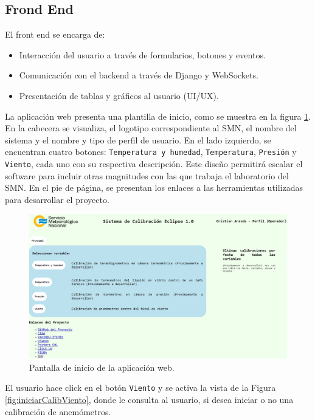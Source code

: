 \subsection{Frond End}\label{sec:frondEnd}

El front end se encarga de:
\begin{itemize}
    \item Interacción del usuario a través de formularios, botones y eventos.
    \item Comunicación con el backend a través de Django y WebSockets.
    \item Presentación de tablas y gráficos al usuario (UI/UX).
\end{itemize}
La aplicación web presenta una plantilla de inicio, como se muestra en la figura \ref{fig:index}. En la cabecera se visualiza, el logotipo correspondiente al SMN, el nombre del sistema y el nombre y tipo de perfil de usuario. En el lado izquierdo, se encuentran cuatro botones: \texttt{Temperatura y humedad}, \texttt{Temperatura}, \texttt{Presión} y \texttt{Viento}, cada uno con su respectiva descripción. Este diseño permitirá escalar el software para incluir otras magnitudes con las que trabaja el laboratorio del SMN. En el pie de página, se presentan los enlaces a las herramientas utilizadas para desarrollar el proyecto.
\begin{figure}[H]
    \centering
    \includegraphics[width=1.1\linewidth]{Figuras/AplicacionWeb/frondend/index.jpg}
    \caption{Pantalla de inicio de la aplicación web.}
    \label{fig:index}
\end{figure}
El usuario hace click en el botón \texttt{Viento} y se activa la vista de la Figura \ref{fig:iniciarCalibViento}, donde le consulta al usuario, si desea iniciar o no una calibración de anemómetros.
